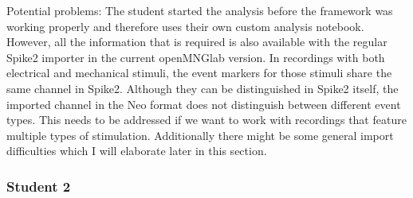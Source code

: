 Potential problems: The student started the analysis before the framework was working properly and therefore uses their own custom analysis notebook. However, all the information that is required is also available with the regular Spike2 importer in the current openMNGlab version.
In recordings with both electrical and mechanical stimuli, the event markers for those stimuli share the same channel in Spike2. Although they can be distinguished in Spike2 itself, the imported channel in the Neo format does not distinguish between different event types. This needs to be addressed if we want to work with recordings that feature multiple types of stimulation.
Additionally there might be some general import difficulties which I will elaborate later in this section.
 
\subsubsection{Student 2}

